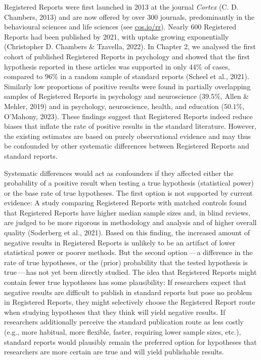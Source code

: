 \documentclass[
  ,man,mask,floatsintext]{apa6}
\begin{document}
Registered Reports were first launched in 2013 at the journal \emph{Cortex} (C. D. Chambers, 2013) and are now offered by over 300 journals, predominantly in the behavioural sciences and life sciences (see \url{cos.io/rr}).
Nearly 600 Registered Reports had been published by 2021, with uptake growing exponentially (Christopher D. Chambers \& Tzavella, 2022).
In Chapter 2, we analysed the first cohort of published Registered Reports in psychology and showed that the first hypothesis reported in these articles was supported in only \(44\%\) of cases, compared to \(96\%\) in a random sample of standard reports (Scheel et al., 2021).
Similarly low proportions of positive results were found in partially overlapping samples of Registered Reports in psychology and neuroscience (\(39.5\%\), Allen \& Mehler, 2019) and in psychology, neuroscience, health, and education (\(50.1\%\), O'Mahony, 2023).
These findings suggest that Registered Reports indeed reduce biases that inflate the rate of positive results in the standard literature.
However, the existing estimates are based on purely observational evidence and may thus be confounded by other systematic differences between Registered Reports and standard reports.

Systematic differences would act as confounders if they affected either the probability of a positive result when testing a true hypothesis (statistical power) or the base rate of true hypotheses.
The first option is not supported by current evidence:
A study comparing Registered Reports with matched controls found that Registered Reports have higher median sample sizes and, in blind reviews, are judged to be more rigorous in methodology and analysis and of higher overall quality (Soderberg et al., 2021).
Based on this finding, the increased amount of negative results in Registered Reports is unlikely to be an artifact of lower statistical power or poorer methods.
But the second option\(\,\)---\(\,\)a difference in the rate of true hypotheses, or the (prior) probability that the tested hypothesis is true\(\,\)---\(\,\)has not yet been directly studied.
The idea that Registered Reports might contain fewer true hypotheses has some plausibility:
If researchers expect that negative results are difficult to publish in standard reports but pose no problem in Registered Reports, they might selectively choose the Registered Report route when studying hypotheses that they think
will yield negative results.
If researchers additionally perceive the standard publication route as less costly (e.g., more habitual, more flexible, faster, requiring lower sample sizes, etc.), standard reports would plausibly remain the preferred option for hypotheses that researchers are more certain are true and will yield publishable results.
\end{document}
